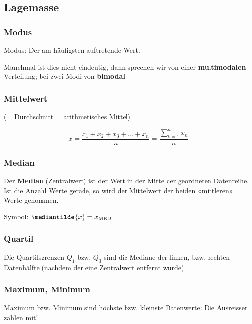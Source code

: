 \begin{multicols}{2}

\subsection*{Lagemasse}


\subsubsection*{Modus}
Modus: Der am häufigsten auftretende Wert.

Manchmal ist dies nicht eindeutig, dann sprechen wir von einer
\textbf{multimodalen} Verteilung; bei zwei Modi von \textbf{bimodal}.


\subsubsection*{Mittelwert}
(= Durchschnitt = arithmetisches Mittel)

$$\overline{x} = \frac{x_1 + x_2 + x_3 + ... +
x_n}{n}=  \frac{\sum\limits_{k=1}^nx_n}n$$

\subsubsection*{Median}


Der \textbf{Median} (Zentralwert) ist der Wert in der Mitte der geordneten Datenreihe. Ist
die Anzahl Werte gerade, so wird der Mittelwert der beiden
«mittleren» Werte genommen.

Symbol: $\mediantilde{x} = x_{\textrm{MED}}$


\subsubsection*{Quartil}

Die Quartilsgrenzen $Q_1$ bzw. $Q_3$ sind die Mediane der linken,
bzw. rechten Datenhälfte (nachdem der eine Zentralwert entfernt
wurde).

\subsubsection*{Maximum, Minimum}

Maximum bzw. Minimum sind höchste bzw. kleinste Datenwerte: Die Ausreisser
zählen mit!

\headerUndFooterJedeSeite{}



\end{multicols}
